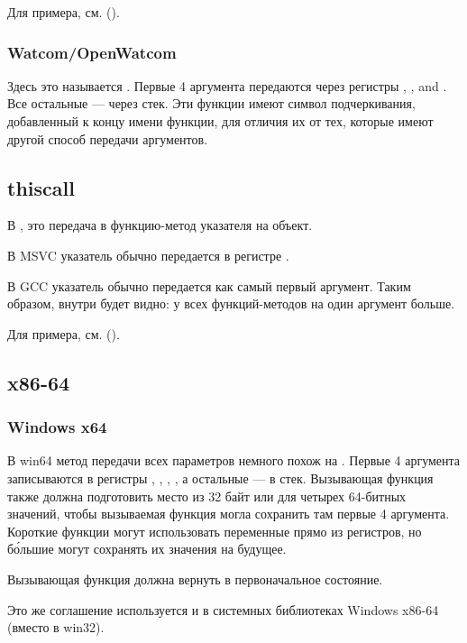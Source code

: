 Для примера, см. ().

\subsubsection{Watcom/OpenWatcom}

Здесь это называется .
Первые 4 аргумента передаются через регистры
\EAX, \EDX, \EBX and \ECX.
Все остальные --- через стек.
Эти функции имеют символ подчеркивания, добавленный к концу имени функции, для отличия их от тех,
которые имеют другой способ передачи аргументов.

\subsection{thiscall}

В \Cpp, это передача в функцию-метод указателя \ITthis на объект.

В MSVC указатель \ITthis обычно передается в регистре \ECX.

В GCC указатель \ITthis обычно передается как самый первый аргумент. 
Таким образом, внутри будет видно: у всех функций-методов на один аргумент больше.

Для примера, см. ().

\subsection{x86-64}

\subsubsection{Windows x64}
\label{sec:callingconventions_win64}

В win64 метод передачи всех параметров немного похож на . 
Первые 4 аргумента записываются в регистры \RCX, \RDX, , , а остальные --- в стек. 
Вызывающая функция также должна подготовить место из 32 байт или для четырех 64-битных значений, 
чтобы вызываемая функция могла сохранить там первые 4 аргумента. 
Короткие функции могут использовать переменные прямо из регистров, 
но б\'{о}льшие могут сохранять их значения на будущее.

Вызывающая функция должна вернуть  
в первоначальное состояние.

Это же соглашение используется и в системных библиотеках Windows x86-64 
(вместо  в win32).

